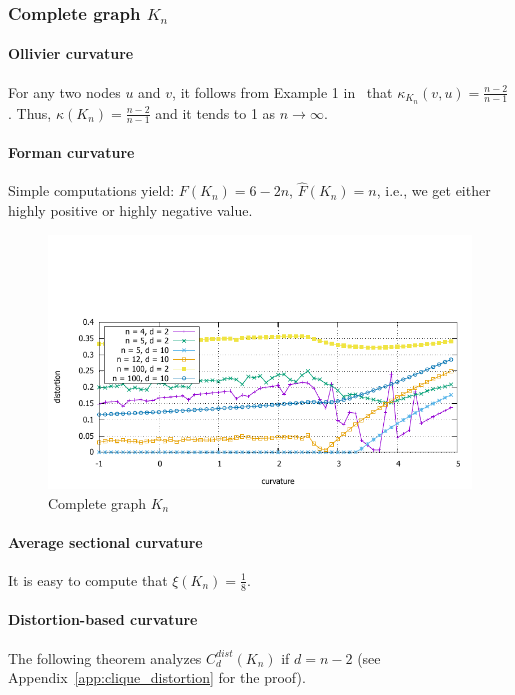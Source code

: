 \documentclass{article} %
\begin{document}
\subsubsection{Complete graph $K_n$}

\paragraph{Ollivier curvature}  
For any two nodes $u$ and $v$, it follows from Example 1 in~\citep{jost2014ollivier} that $\kappa_{K_n}(v, u) = \frac{n-2}{n-1}$. Thus, $\kappa(K_n) = \frac{n-2}{n-1}$ and it tends to 1 as $n \to \infty$.

\paragraph{Forman curvature} 
Simple computations yield:
$F(K_n) = 6 - 2n$, $\hat{F}(K_n) = n$, i.e., we get either highly positive or highly negative value.

\begin{figure}
    \centering
    \includegraphics[width = 0.8 \textwidth]{clique_distortion.pdf}
    \caption{Complete graph $K_n$}
    \label{fig:clique}
\end{figure}

\paragraph{Average sectional curvature} It is easy to compute that
$\xi(K_n) = \frac{1}{8}$.

\paragraph{Distortion-based curvature}

The following theorem analyzes $C_d^{dist}(K_n)$ if $d = n-2$ (see Appendix~\ref{app:clique_distortion} for the proof). 
\end{document}

